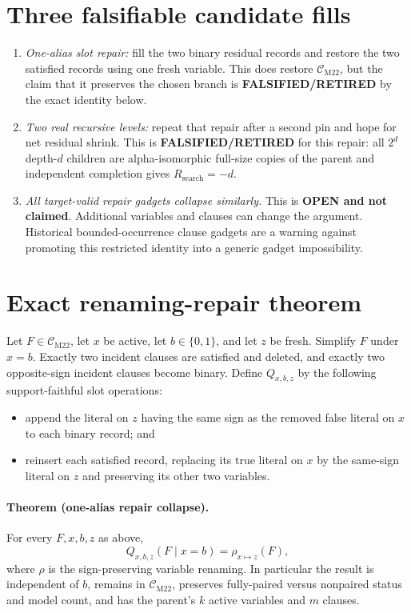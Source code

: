\documentclass[11pt]{article}
\newcommand{\CM}{\mathcal C_{\mathrm{M22}}}
\newcommand{\Rsearch}{R_{\mathrm{search}}}
\begin{document}
\section{Three falsifiable candidate fills}
\begin{enumerate}
\item \emph{One-alias slot repair:} fill the two binary residual records and
restore the two satisfied records using one fresh variable.  This does restore
$\CM$, but the claim that it preserves the chosen branch is
\textbf{FALSIFIED/RETIRED} by the exact identity below.
\item \emph{Two real recursive levels:} repeat that repair after a second
pin and hope for net residual shrink.  This is
\textbf{FALSIFIED/RETIRED} for this repair: all $2^d$ depth-$d$ children are
alpha-isomorphic full-size copies of the parent and independent completion
gives $\Rsearch=-d$.
\item \emph{All target-valid repair gadgets collapse similarly.}  This is
\textbf{OPEN and not claimed}.  Additional variables and clauses can change
the argument.  Historical bounded-occurrence clause gadgets are a warning
against promoting this restricted identity into a generic gadget
impossibility.
\end{enumerate}

\section{Exact renaming-repair theorem}
Let $F\in\CM$, let $x$ be active, let $b\in\{0,1\}$, and let $z$ be fresh.
Simplify $F$ under $x=b$.  Exactly two incident clauses are satisfied and
deleted, and exactly two opposite-sign incident clauses become binary.
Define $Q_{x,b,z}$ by the following support-faithful slot operations:
\begin{itemize}
\item append the literal on $z$ having the same sign as the removed false
literal on $x$ to each binary record; and
\item reinsert each satisfied record, replacing its true literal on $x$ by
the same-sign literal on $z$ and preserving its other two variables.
\end{itemize}

\paragraph{Theorem (one-alias repair collapse).}
For every $F,x,b,z$ as above,
\[
 Q_{x,b,z}(F\mid x=b)=\rho_{x\mapsto z}(F),
\]
where $\rho$ is the sign-preserving variable renaming.  In particular the
result is independent of $b$, remains in $\CM$, preserves fully-paired versus
nonpaired status and model count, and has the parent's $k$ active variables
and $m$ clauses.
\end{document}
